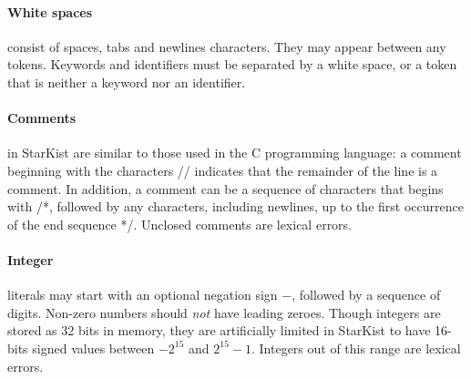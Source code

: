 \documentclass{article}
\begin{document}
\paragraph{White spaces} consist of spaces, tabs and newlines
characters. They may appear between any tokens.
Keywords and identifiers must be separated by a white space,
or a token that is neither a keyword nor an identifier.
\paragraph{Comments} in StarKist are similar to those used in the C programming language:
a comment beginning with the characters // indicates that the remainder of the line is a comment.
In addition, a comment can be a sequence of characters that begins with /*,
followed by any characters, including newlines, up to the first occurrence of the end sequence */. Unclosed comments are lexical errors.
\paragraph{Integer} literals may start with an optional negation sign $-$,
followed by a sequence of digits.
Non-zero numbers should \textit{not} have leading zeroes.
Though integers are stored as 32 bits in memory,
they are artificially limited in StarKist to have
16-bits signed values between $-2^{15}$ and $2^{15}-1$.
Integers out of this range are lexical errors.
\end{document}
